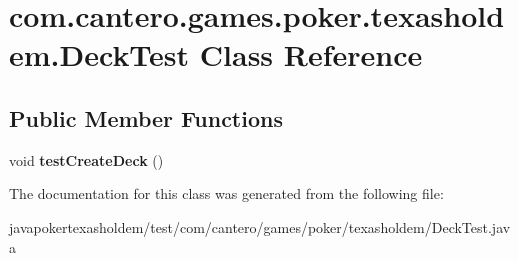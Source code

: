 \hypertarget{classcom_1_1cantero_1_1games_1_1poker_1_1texasholdem_1_1_deck_test}{}\section{com.\+cantero.\+games.\+poker.\+texasholdem.\+Deck\+Test Class Reference}
\label{classcom_1_1cantero_1_1games_1_1poker_1_1texasholdem_1_1_deck_test}
\subsection*{Public Member Functions}
\begin{DoxyCompactItemize}
\item 
\hypertarget{classcom_1_1cantero_1_1games_1_1poker_1_1texasholdem_1_1_deck_test_af48f549da9596dccb066033f44bf4db4}{}void {\bfseries test\+Create\+Deck} ()\label{classcom_1_1cantero_1_1games_1_1poker_1_1texasholdem_1_1_deck_test_af48f549da9596dccb066033f44bf4db4}

\end{DoxyCompactItemize}


The documentation for this class was generated from the following file\+:\begin{DoxyCompactItemize}
\item 
javapokertexasholdem/test/com/cantero/games/poker/texasholdem/Deck\+Test.\+java\end{DoxyCompactItemize}
